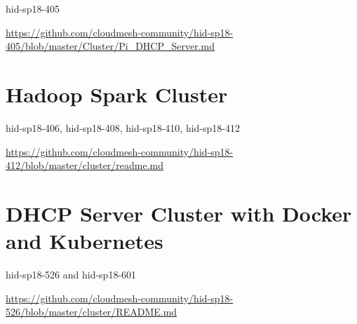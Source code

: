 hid-sp18-405 

\url{https://github.com/cloudmesh-community/hid-sp18-405/blob/master/Cluster/Pi_DHCP_Server.md}



\section{Hadoop Spark Cluster }

hid-sp18-406,  hid-sp18-408, hid-sp18-410, hid-sp18-412

\url{https://github.com/cloudmesh-community/hid-sp18-412/blob/master/cluster/readme.md}

 

\section{DHCP Server Cluster with Docker and Kubernetes }

hid-sp18-526 and hid-sp18-601

\url{https://github.com/cloudmesh-community/hid-sp18-526/blob/master/cluster/README.md}


